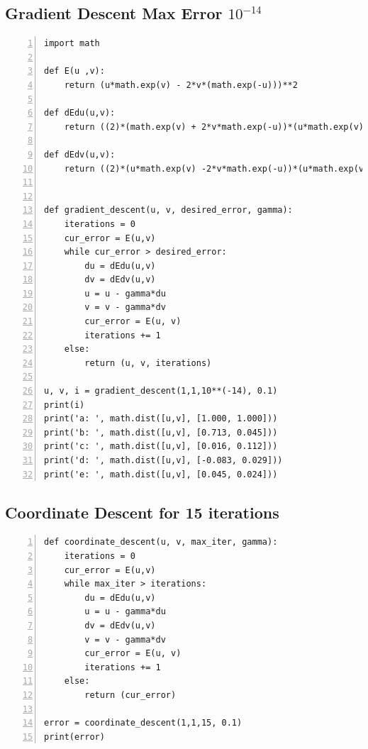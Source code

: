 \documentclass{article}
\begin{document}
\subsection{\label{prob5}Gradient Descent Max Error $10^{-14}$}
\begin{lstlisting}[frame=single,
numbers=left,
style=Matlab-Pyglike]
import math

def E(u ,v):
    return (u*math.exp(v) - 2*v*(math.exp(-u)))**2

def dEdu(u,v):
    return ((2)*(math.exp(v) + 2*v*math.exp(-u))*(u*math.exp(v) -2*v*math.exp(-u)))

def dEdv(u,v):
    return ((2)*(u*math.exp(v) -2*v*math.exp(-u))*(u*math.exp(v) - 2*math.exp(-u)))


def gradient_descent(u, v, desired_error, gamma):
    iterations = 0
    cur_error = E(u,v)
    while cur_error > desired_error:
        du = dEdu(u,v)
        dv = dEdv(u,v)
        u = u - gamma*du
        v = v - gamma*dv
        cur_error = E(u, v)
        iterations += 1
    else:
        return (u, v, iterations)

u, v, i = gradient_descent(1,1,10**(-14), 0.1)
print(i)
print('a: ', math.dist([u,v], [1.000, 1.000]))
print('b: ', math.dist([u,v], [0.713, 0.045]))
print('c: ', math.dist([u,v], [0.016, 0.112]))
print('d: ', math.dist([u,v], [-0.083, 0.029]))
print('e: ', math.dist([u,v], [0.045, 0.024]))
\end{lstlisting}
\newpage
\subsection{\label{prob6} Coordinate Descent for 15 iterations}
\begin{lstlisting}[frame=single,
numbers=left,
style=Matlab-Pyglike]
def coordinate_descent(u, v, max_iter, gamma):
    iterations = 0
    cur_error = E(u,v)
    while max_iter > iterations:
        du = dEdu(u,v)
        u = u - gamma*du
        dv = dEdv(u,v)
        v = v - gamma*dv
        cur_error = E(u, v)
        iterations += 1
    else:
        return (cur_error)

error = coordinate_descent(1,1,15, 0.1)
print(error)
\end{lstlisting}
\newpage
\end{document}
